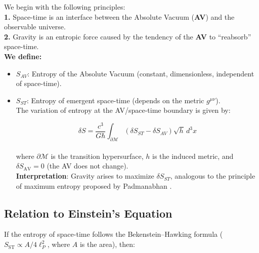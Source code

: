 \documentclass[a4paper]{article}
\theoremstyle{definition}
\theoremstyle{remark}
\numberwithin{equation}{section}
\begin{document}
\begin{flushleft}
	We begin with the following principles:\\
	
	\textbf{1.} Space-time is an interface between the Absolute Vacuum (\textbf{AV}) and the observable universe.\\
	
	\textbf{2.} Gravity is an entropic force caused by the tendency of the \textbf{AV} to ``reabsorb'' space-time.\\
	
	\textbf{We define:}
	
	\begin{itemize}
		\item \( S_{AV} \): Entropy of the Absolute Vacuum (constant, dimensionless, independent of space-time).\\
		
		\item \( S_{ST} \): Entropy of emergent space-time (depends on the metric \(g^{\mu\nu}\)).\\
		
		The variation of entropy at the AV/space-time boundary is given by:
		
		\begin{equation}
			\delta S = \frac{c^3}{G \hbar} \int_{\partial \mathcal{M}} \left( \delta S_{ST} - \delta S_{AV} \right) \sqrt{h} \, d^3 x
		\end{equation}\\
		
		where \( \partial \mathcal{M} \) is the transition hypersurface, \( h \) is the induced metric, and \( \delta S_{\text{AV}} = 0 \) (the AV does not change).\\
		
		\textbf{Interpretation}: Gravity arises to maximize \( \delta S_{ST} \), analogous to the principle of maximum entropy proposed by Padmanabhan \cite{Padmanabhan}.
	\end{itemize}
\end{flushleft}

	
	
\subsection{Relation to Einstein's Equation}

If the entropy of space-time follows the Bekenstein–Hawking formula (\( S_{\text{ST}} \propto A/4\ell_P^2 \), where \( A \) is the area), then:
\end{document}
